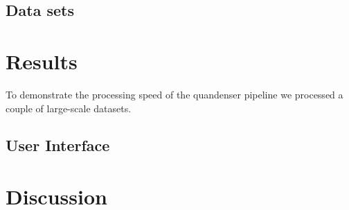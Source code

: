 \documentclass[11pt]{article}
\begin{document}
\subsection*{Data sets}

\section*{Results}

To demonstrate the processing speed of the quandenser pipeline we processed a couple of large-scale datasets.

\subsection*{User Interface}


\section*{Discussion}



\end{document}
